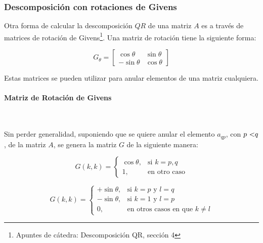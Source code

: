 \documentclass[spanish]{article}
\begin{document}
        \subsubsection{Descomposición con rotaciones de Givens}
            
            \par Otra forma de calcular la descomposición $QR$ de una matriz $A$ es a través de matrices de rotación de Givens\footnote{Apuntes de cátedra: Descomposición QR, sección 4}. Una matriz de rotación tiene la siguiente forma:
            
            \begin{equation}
                G_{\theta} = 
                        \begin{bmatrix}
                            \cos{\theta} & \sin{\theta} \\
                            -\sin{\theta} & \cos{\theta}
                        \end{bmatrix}
            \end{equation}

            Estas matrices se pueden utilizar para anular elementos de una matriz cualquiera. 
            
            \paragraph{Matriz de Rotación de Givens} ~
            \par Sin perder generalidad, suponiendo que se quiere anular el elemento $a_{q p}$, con $p \text{ \textless } q$, de la matriz $A$, se genera la matriz $G$ de la siguiente manera:
            
            \begin{equation}
                G(k,k) = 
                    \begin{cases}
                        \cos{\theta}, & \text{si $k = p,q$}\\
                        1, & \text{en otro caso}
                    \end{cases}
            \end{equation}
            
            \begin{equation}
                G(k,k) = 
                    \begin{cases}
                        +\sin{\theta}, & \text{si $k = p$ y $l = q$}\\
                        -\sin{\theta}, & \text{si $k = 1$ y $l = p$}\\
                        0, & \text{en otros casos en que $k \neq l$}
                    \end{cases}
            \end{equation}
            
\end{document}
